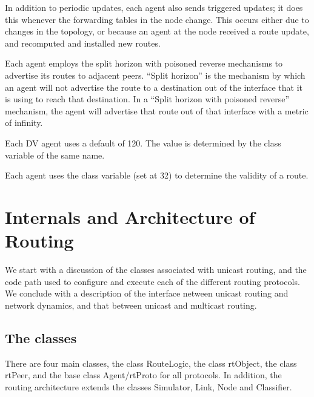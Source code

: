 In addition to periodic updates, each agent also sends triggered updates;
it does this whenever the forwarding tables in the node change.
This occurs either due to changes in the topology, 
or because an agent at the node received a route update,
and recomputed and installed new routes.

Each agent employs the split horizon with poisoned reverse mechanisms
to advertise its routes to adjacent peers.
``Split horizon'' is the mechanism by which an agent will not advertise
the route to a destination out of the interface that it is using to
reach that destination.
In a ``Split horizon with poisoned reverse'' mechanism,
the agent will advertise that route out of that interface with 
a metric of infinity.

Each DV agent uses a default  of 120.
The value is determined by the class variable of the same name.

Each agent uses the class variable  (set at 32)
to determine the validity of a route.

\section{Internals and Architecture of Routing}
\label{sec:rtg-internals}

We start with a discussion of the classes associated with
unicast routing, and the code path used to configure and execute
each of the different routing protocols.
We conclude with a description of
the interface netween unicast routing and network dynamics, and
that between unicast and multicast routing.

\subsection{The classes}
There are four main classes,
the class RouteLogic, the class rtObject, the class rtPeer, and the
base class Agent/rtProto for all protocols.
In addition, the routing architecture extends 
the classes Simulator, Link, Node and Classifier.

